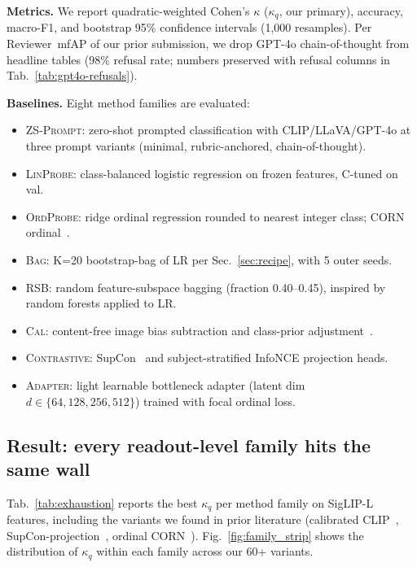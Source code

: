 \textbf{Metrics.} We report quadratic-weighted Cohen's $\kappa$
($\kappa_q$, our primary), accuracy, macro-F1, and bootstrap 95\%
confidence intervals (1{,}000 resamples). Per Reviewer~mfAP of our
prior submission, we drop GPT-4o chain-of-thought from headline
tables (98\% refusal rate; numbers preserved with refusal columns
in Tab.~\ref{tab:gpt4o-refusals}).

\textbf{Baselines.} Eight method families are evaluated:
\begin{itemize}\itemsep0pt
  \item \textsc{ZS-Prompt}: zero-shot prompted classification with
  CLIP/LLaVA/GPT-4o at three prompt variants (minimal,
  rubric-anchored, chain-of-thought).
  \item \textsc{LinProbe}: class-balanced logistic regression on
  frozen features, C-tuned on val.
  \item \textsc{OrdProbe}: ridge ordinal regression rounded to
  nearest integer class; CORN ordinal~\cite{shi2023corn}.
  \item \textsc{Bag}: K=20 bootstrap-bag of LR per
  Sec.~\ref{sec:recipe}, with 5 outer seeds.
  \item \textsc{RSB}: random feature-subspace bagging (fraction
  0.40--0.45), inspired by random forests applied to LR.
  \item \textsc{Cal}: content-free image bias subtraction
  \cite{zhao2021calibrate} and class-prior
  adjustment~\cite{menon2021logit}.
  \item \textsc{Contrastive}: SupCon~\cite{khosla2020supcon} and
  subject-stratified InfoNCE projection heads.
  \item \textsc{Adapter}: light learnable bottleneck adapter
  (latent dim $d \in \{64, 128, 256, 512\}$) trained with focal
  ordinal loss.
\end{itemize}

\subsection{Result: every readout-level family hits the same wall}
\label{sec:exhaustion}

Tab.~\ref{tab:exhaustion} reports the best $\kappa_q$ per method
family on SigLIP-L features, including the variants we found in
prior literature (calibrated CLIP~\cite{wortsman2022robust},
SupCon-projection~\cite{khosla2020supcon}, ordinal
CORN~\cite{shi2023corn}). Fig.~\ref{fig:family_strip} shows the
distribution of $\kappa_q$ within each family across our 60+
variants.

